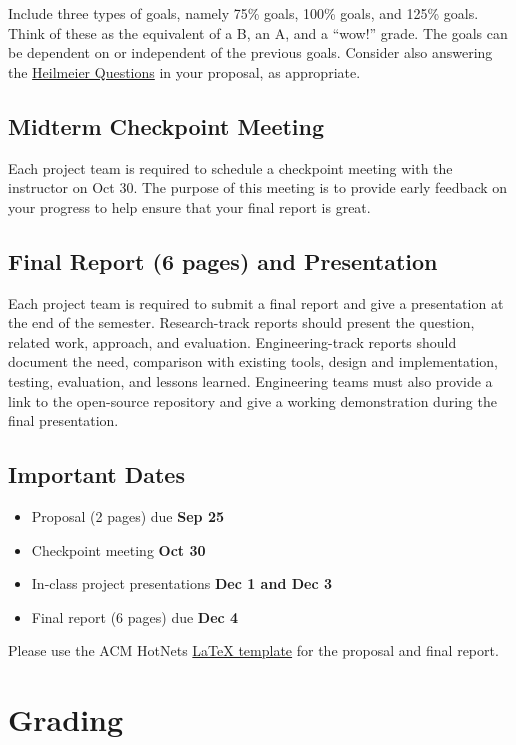 \documentclass[11pt]{article}
\begin{document}
Include three types of goals, namely 75\% goals, 100\% goals, and 125\% goals.
Think of these as the equivalent of a B, an A, and a ``wow!'' grade. The goals
can be dependent on or independent of the previous goals. Consider also answering
the \href{https://www.darpa.mil/work-with-us/heilmeier-catechism}{Heilmeier
Questions} in your proposal, as appropriate.

\subsection{Midterm Checkpoint Meeting}
Each project team is required to schedule a checkpoint meeting with the
instructor on Oct 30. The purpose of this meeting is to provide early feedback
on your progress to help ensure that your final report is great.

\subsection{Final Report (6 pages) and Presentation}
Each project team is required to submit a final report and give a presentation
at the end of the semester. Research-track reports should present the question,
related work, approach, and evaluation. Engineering-track reports should
document the need, comparison with existing tools, design and implementation,
testing, evaluation, and lessons learned. Engineering teams must also provide a
link to the open-source repository and give a working demonstration during the
final presentation.

\subsection{Important Dates}
\begin{itemize}
  \item Proposal (2 pages) due \textbf{Sep 25}
  \item Checkpoint meeting \textbf{Oct 30}
  \item In-class project presentations \textbf{Dec 1 and Dec 3}
  \item Final report (6 pages) due \textbf{Dec 4}
\end{itemize}
Please use the ACM HotNets
\href{https://conferences.sigcomm.org/hotnets/2026/cfp.html}{LaTeX template}
for the proposal and final report.

\section{Grading}
\end{document}
